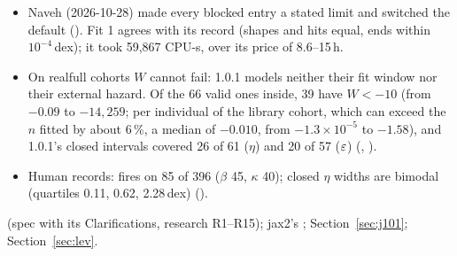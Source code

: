 \begin{itemize}[nosep]
    is closed on 6 of 227, and its upper end is always the $\kappa$ box's.
  \item Naveh (2026-10-28) made every blocked entry a stated limit and switched the default
    (). Fit 1 agrees with its record (shapes and hits equal, ends within $10^{-4}$\,dex); it
    took 59,867 CPU-s, over its price of 8.6--15\,h.
  \item On realfull cohorts $W$ cannot fail: 1.0.1 models neither their fit window nor their external hazard. Of the 66
    valid ones inside, 39 have $W<-10$ (from $-0.09$ to $-14{,}259$; per individual of the library cohort, which can exceed the $n$ fitted by about 6\,\%, a median of $-0.010$, from
    $-1.3\times10^{-5}$ to $-1.58$), and 1.0.1's closed intervals covered 26 of 61 ($\eta$) and 20 of 57 ($\varepsilon$)
    (, ).
  \item Human records:  fires on 85 of 396 ($\beta$ 45, $\kappa$ 40); closed $\eta$ widths are
    bimodal (quartiles 0.11, 0.62, 2.28\,dex) ().
\end{itemize}

\tplRefs
{} (spec with its Clarifications, research R1--R15); jax2's ;
Section~\ref{sec:j101}; Section~\ref{sec:lev}.
